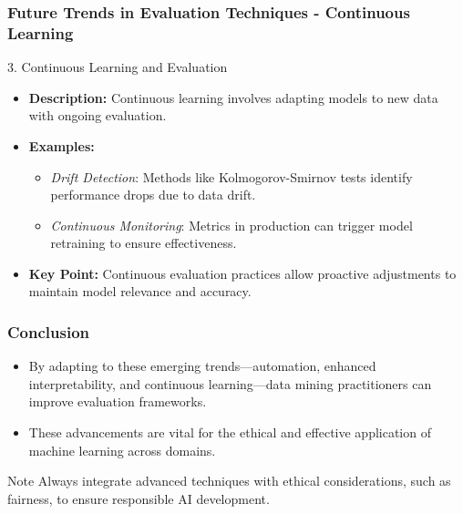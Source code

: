 \documentclass[aspectratio=169]{beamer}
\begin{document}
\begin{frame}[fragile]
    \frametitle{Future Trends in Evaluation Techniques - Continuous Learning}
    \begin{block}{3. Continuous Learning and Evaluation}
        \begin{itemize}
            \item \textbf{Description:} Continuous learning involves adapting models to new data with ongoing evaluation.
            \item \textbf{Examples:}
            \begin{itemize}
                \item \textit{Drift Detection}: Methods like Kolmogorov-Smirnov tests identify performance drops due to data drift.
                \item \textit{Continuous Monitoring}: Metrics in production can trigger model retraining to ensure effectiveness.
            \end{itemize}
            \item \textbf{Key Point:} Continuous evaluation practices allow proactive adjustments to maintain model relevance and accuracy.
        \end{itemize}
    \end{block}
\end{frame}

\begin{frame}[fragile]
    \frametitle{Conclusion}
    \begin{itemize}
        \item By adapting to these emerging trends—automation, enhanced interpretability, and continuous learning—data mining practitioners can improve evaluation frameworks.
        \item These advancements are vital for the ethical and effective application of machine learning across domains.
    \end{itemize}
    \begin{block}{Note}
        Always integrate advanced techniques with ethical considerations, such as fairness, to ensure responsible AI development.
    \end{block}
\end{frame}
\end{document}
